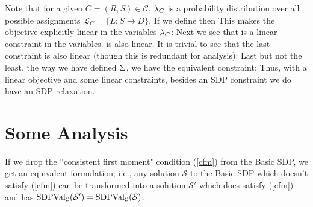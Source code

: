 Note that for a given $C =(R, S) \in \mathcal{C}$, $\lambda_C$ is a probability distribution over all possible assignments $\mathcal{L}_C = \{L: S \rightarrow D\}$. 
If we define 
then 
This makes the objective explicitly linear in the variables $\lambda_C$:
Next we see that 
is a linear constraint in the variables. 
is also linear.
It is trivial to see that the last constraint is also linear (though this is redundant for analysis):
Last but not the least, the way we have defined $\Sigma$, we have the equivalent constraint:
Thus, with a linear objective and some linear constraints, besides an SDP constraint we do have an SDP relaxation.


\section{Some Analysis}
\begin{remark}\label{remark01}
If we drop the ``consistent first moment" condition (\ref{cfm}) from the Basic SDP, we get
an equivalent formulation; i.e., any solution $\mathcal{S}$ to the Basic SDP which doesn't satisfy  (\ref{cfm}) can be transformed into a solution $\mathcal{S}'$ which does satisfy  (\ref{cfm}) and has $\mbox{SDPVal}_{\mathcal{C}}(\mathcal{S}')
= \mbox{SDPVal}_{\mathcal{C}} (\mathcal{S})$.
\end{remark}

